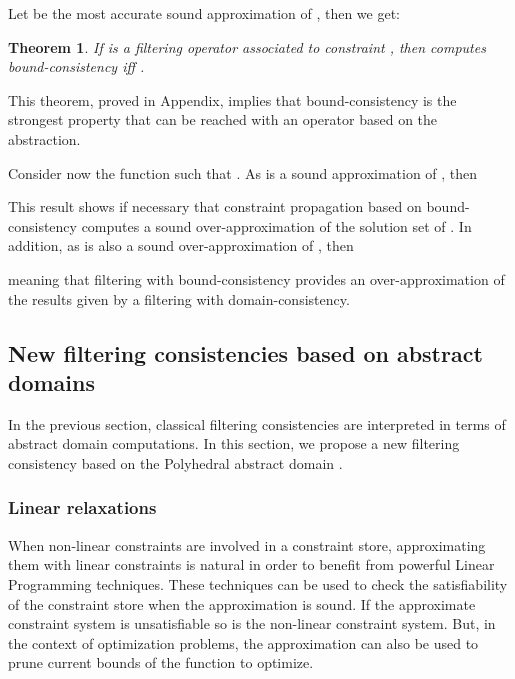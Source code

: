 \documentclass[submission,copyright,creativecommons]{eptcs}
\newtheorem{theorem}{Theorem}
\begin{document}
\begin{center}

\end{center}

\noindent
Let  be the most accurate sound approximation of , then we get:



\begin{theorem}
 If  is a filtering operator associated to constraint , then   computes 
 bound-consistency iff . 
\end{theorem}

\noindent
This theorem, proved in Appendix, implies that bound-consistency is the strongest property that can be reached with an operator
based on the  abstraction.

\noindent
Consider now the function  such that
. As
 is a sound approximation of , then

This result shows if necessary that constraint propagation based on bound-consistency computes
a sound over-approximation of the solution set of .
In addition, as  is also a sound over-approximation of , then 

meaning that filtering with bound-consistency provides an over-approximation of the results given by a 
filtering with domain-consistency.
 
\subsection{New filtering consistencies based on abstract domains}
\label{sec:DynaLIB_global}
In the previous section, classical filtering consistencies are interpreted in terms
of abstract domain computations. In this section, we propose a
new filtering consistency based on the Polyhedral abstract domain \cite{CH78}. 

\subsubsection{Linear relaxations}\label{sec:DLRs}

When non-linear constraints are involved in a constraint store, approximating them 
with linear constraints is natural in order to benefit from powerful Linear
Programming techniques. These techniques can be used to check the satisfiability 
of the constraint store when the approximation is sound. If the approximate constraint 
system is unsatisfiable so is the non-linear constraint system. But, in the context
of optimization problems, the approximation
can also be used to prune current bounds of the function to optimize. 
\end{document}
